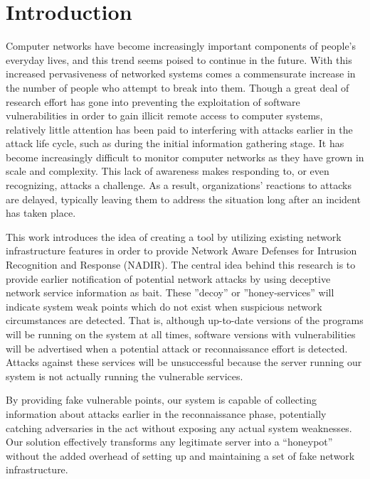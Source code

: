 \section{Introduction}
\label{introduction}


Computer networks have become increasingly important components of people's everyday lives, and this trend seems poised to continue in the future. With this increased pervasiveness of networked systems comes a commensurate increase in the number of people who attempt to break into them. Though a great deal of research effort has gone into preventing the exploitation of software vulnerabilities in order to gain illicit remote access to computer systems, relatively little attention has been paid to interfering with attacks earlier in the attack life cycle, such as during the initial information gathering stage. It has become increasingly difficult to monitor computer networks as they have grown in scale and complexity. This lack of awareness makes responding to, or even recognizing, attacks a challenge. As a result, organizations' reactions to attacks are delayed, typically leaving them to address the situation long after an incident has taken place.

This work introduces the idea of creating a tool by utilizing existing network infrastructure features in order to provide Network Aware Defenses for Intrusion Recognition and Response (NADIR). The central idea behind this research is to provide earlier notification of potential network attacks by using deceptive network service information  as bait. These ''decoy'' or ''honey-services'' will indicate system weak points which do not exist when suspicious network circumstances are detected. That is, although up-to-date versions of the programs will be running on the system at all times, software versions with vulnerabilities will be advertised when a potential attack or reconnaissance effort is detected. Attacks against these services will be unsuccessful because the server running our system is not actually running the vulnerable services. 

By providing fake vulnerable points, our system is capable of collecting information about attacks earlier in the reconnaissance phase, potentially catching adversaries in the act without exposing any actual system weaknesses. Our solution effectively transforms any legitimate server into a ``honeypot'' without the added overhead of setting up and maintaining a set of fake network infrastructure.

